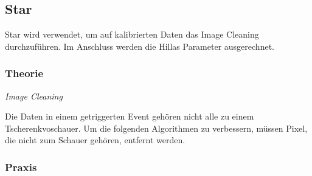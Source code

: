 \subsection{Star}%
\label{sub:star}

Star wird verwendet, um auf kalibrierten Daten
das Image Cleaning
durchzuführen.
Im Anschluss werden die Hillas Parameter ausgerechnet.

\subsubsection*{Theorie}%
\label{ssub:theorie}

\textit{Image Cleaning}

Die Daten in einem getriggerten Event gehören nicht alle zu einem
Tscherenkvoschauer.
Um die folgenden Algorithmen zu verbessern,
müssen Pixel, die nicht zum Schauer gehören, entfernt werden.

\subsubsection*{Praxis}%
\label{ssub:praxis}

